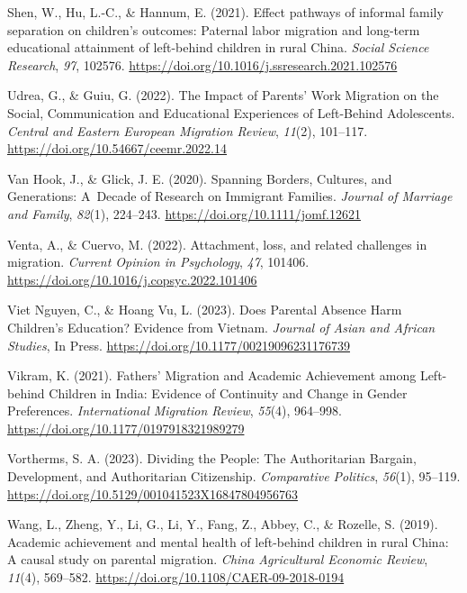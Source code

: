 \documentclass[
  man]{apa7}
\newlength{\cslhangindent}
\newlength{\cslentryspacingunit} %
\newenvironment{CSLReferences}[2] %
 {%
  \setlength{\parindent}{0pt}
  \ifodd #1
  \let\oldpar\par
  \def\par{\hangindent=\cslhangindent\oldpar}
  \fi
  \setlength{\parskip}{#2\cslentryspacingunit}
 }%
 {}
\begin{document}
\begin{CSLReferences}{1}{0}
\leavevmode{}%
Shen, W., Hu, L.-C., \& Hannum, E. (2021). Effect pathways of informal family separation on children's outcomes: Paternal labor migration and long-term educational attainment of left-behind children in rural {China}. \emph{Social Science Research}, \emph{97}, 102576. \url{https://doi.org/10.1016/j.ssresearch.2021.102576}

\leavevmode{}%
Udrea, G., \& Guiu, G. (2022). The Impact of Parents{'} Work Migration on the Social, Communication and Educational Experiences of Left-Behind Adolescents. \emph{Central and Eastern European Migration Review}, \emph{11}(2), 101--117. \url{https://doi.org/10.54667/ceemr.2022.14}

\leavevmode{}%
Van Hook, J., \& Glick, J. E. (2020). Spanning Borders, Cultures, and Generations: A~Decade of Research on Immigrant Families. \emph{Journal of Marriage and Family}, \emph{82}(1), 224--243. \url{https://doi.org/10.1111/jomf.12621}

\leavevmode{}%
Venta, A., \& Cuervo, M. (2022). Attachment, loss, and related challenges in migration. \emph{Current Opinion in Psychology}, \emph{47}, 101406. \url{https://doi.org/10.1016/j.copsyc.2022.101406}

\leavevmode{}%
Viet Nguyen, C., \& Hoang Vu, L. (2023). Does Parental Absence Harm Children{'}s Education? Evidence from Vietnam. \emph{Journal of Asian and African Studies}, In Press. \url{https://doi.org/10.1177/00219096231176739}

\leavevmode{}%
Vikram, K. (2021). Fathers{'} Migration and Academic Achievement among Left-behind Children in India: Evidence of Continuity and Change in Gender Preferences. \emph{International Migration Review}, \emph{55}(4), 964--998. \url{https://doi.org/10.1177/0197918321989279}

\leavevmode{}%
Vortherms, S. A. (2023). Dividing the {People}: {The Authoritarian Bargain}, {Development}, and {Authoritarian Citizenship}. \emph{Comparative Politics}, \emph{56}(1), 95--119. \url{https://doi.org/10.5129/001041523X16847804956763}

\leavevmode{}%
Wang, L., Zheng, Y., Li, G., Li, Y., Fang, Z., Abbey, C., \& Rozelle, S. (2019). Academic achievement and mental health of left-behind children in rural {China}: A causal study on parental migration. \emph{{China} Agricultural Economic Review}, \emph{11}(4), 569--582. \url{https://doi.org/10.1108/CAER-09-2018-0194}


\end{CSLReferences}
\end{document}
